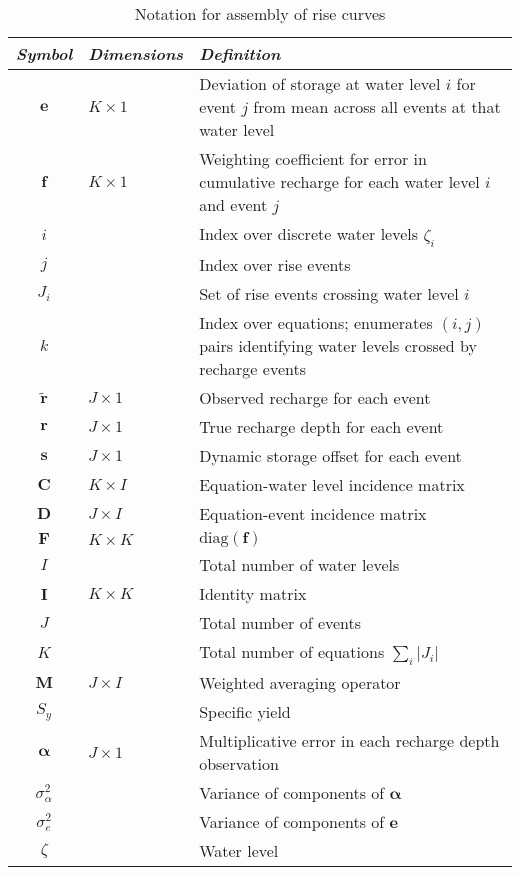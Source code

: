\documentclass[11pt,a4paper]{article}
\renewcommand{\vec}[1]{\mathbf{#1}}
\begin{document}
\begin{table}[b!]
  \centering
  \begin{tabular}{clp{9.8cm}}
    \emph{Symbol} & \emph{Dimensions} & \emph{Definition} \\
    \hline
    $\vec{e}$ & $K\times 1$ & Deviation of storage at water level $i$ for event $j$ from mean across all events at that water level \\
    $\vec{f}$ & $K\times 1$ & Weighting coefficient for error in cumulative
                              recharge for each water level $i$ and event $j$\\
    $i$ & & Index over discrete water levels $\zeta_i$\\
    $j$ & & Index over rise events\\
    $J_i$ & & Set of rise events crossing water level $i$\\
    $k$ & & Index over equations; enumerates $(i, j)$ pairs identifying water levels crossed by recharge events \\
    $\tilde{\vec{r}}$ & $J\times 1$ & Observed recharge for each event \\
    $\vec{r}$ & $J\times 1$ & True recharge depth for each event \\
    $\vec{s}$ & $J\times 1$ & Dynamic storage offset for each event \\
    $\vec{C}$ & $K\times I$ & Equation-water level incidence matrix \\
    $\vec{D}$ & $J\times I$ & Equation-event incidence matrix \\
    $\vec{F}$ & $K\times K$ & $\text{diag}(\vec{f})$ \\
    $I$ & & Total number of water levels \\
    $\vec{I}$ & $K\times K$ & Identity matrix \\
    $J$ & & Total number of events \\
    $K$ & & Total number of equations $\sum_i |J_i|$ \\
    $\vec{M}$ & $J\times I$ & Weighted averaging operator \\
    $S_y$ & & Specific yield \\
    $\bm\alpha$ & $J\times 1$ & Multiplicative error in each recharge depth observation \\
    $\sigma_\alpha^2$ & & Variance of components of $\bm\alpha$ \\
    $\sigma_e^2$ & & Variance of components of $\vec{e}$ \\
    $\zeta$ & & Water level \\
  \end{tabular}
  \caption{Notation for assembly of rise curves}
  \label{tab:rise_notation}
\end{table}
\end{document}
